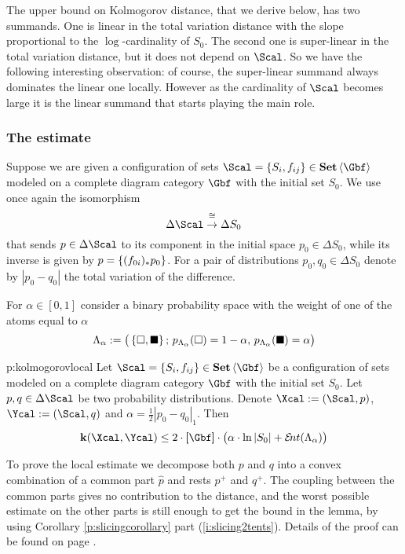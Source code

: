   The upper bound on Kolmogorov distance, that we derive below, has two
  summands. One is linear in the total variation distance with the
  slope proportional to the $\log$-cardinality of $S_{0}$. The second one is
  super-linear in the total variation distance, but it does not depend
  on $\Scal$. So we have the following interesting observation: of
  course, the super-linear summand always dominates the linear one
  locally. However as the cardinality of $\Scal$ becomes large it is
  the linear summand that starts playing the main role.

\subsubsection{The estimate}
\label{p:kolmogorov-local-estimate}
  Suppose we are given a configuration of sets
  $\Scal=\set{S_{i},f_{ij}}\in\Set\<\Gbf>$ modeled on a complete diagram
  category $\Gbf$ with the initial set $S_{0}$.  
  We use once again the isomorphism
  \[ 
  \Delta\Scal\stackrel{\cong}{\to}\Delta S_{0}
  \]      
  that sends $p\in\Delta\Scal$ to its component in the initial space
  $p_{0}\in\Delta S_{0}$, while its inverse is given by
  $p=\left\{(f_{0i})_{*}p_{0}\right\}$.  For a pair of distributions
  $p_{0},q_{0}\in\Delta S_{0}$ denote by $|p_{0}-q_{0}|$ the
  total variation of the difference.

  For $\alpha\in[0,1]$ consider a binary probability space with the
  weight of one of the atoms equal to $\alpha$
  \[
  \Lambda_{\alpha}
  :=
  \big(
    \left\{\square,\blacksquare\right\};\,
    p_{\Lambda_{\alpha}}(\square)=1-\alpha,\,
    p_{\Lambda_{\alpha}}(\blacksquare)=\alpha
  \big)
  \]

  \newpage        
  \begin{proposition}{p:kolmogorovlocal}
    Let $\Scal=\set{S_{i},f_{ij}}\in\Set\<\Gbf>$ be a configuration of
    sets modeled on a complete diagram category $\Gbf$ with the
    initial set $S_{0}$. Let $p,q\in\Delta \Scal$ be two probability
    distributions.
    Denote $\Xcal:=(\Scal,p)$, $\Ycal:=(\Scal,q)$ and
    $\alpha=\frac12|p_{0}-q_{0}|_1$. Then
    \[
    \ikd(\Xcal,\Ycal)
    \leq
    2\cdot\size{\Gbf}\cdot\big(\alpha\cdot\ln|S_{0}|+\ent(\Lambda_{\alpha})\big)
    \]
  \end{proposition}
  To prove the local estimate we decompose both $p$ and $q$ into
  a convex combination of a common part $\hat p$ and rests $p^{+}$ and $q^+$. 
  The coupling between the common parts gives no contribution to the distance, and the worst possible estimate on the other parts is still enough to get the bound in the lemma, by using Corollary \ref{p:slicingcorollary} part (\ref{i:slicing2tents}). 
  Details of the proof can be found on page \pageref{p:kolmogorovlocal.rep}.
  
